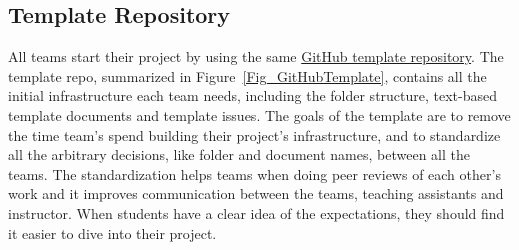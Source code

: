\documentclass[10pt, conference]{IEEEtran}
\begin{document}
\subsection{Template Repository}

All teams start their project by using the same
\href{REDACTED Link} {GitHub template repository}. The template repo, summarized
in Figure~\ref{Fig_GitHubTemplate}, contains all the initial infrastructure each
team needs, including the folder structure, text-based template documents and
template issues. The goals of the template are to remove the time team's spend
building their project's infrastructure, and to standardize all the arbitrary
decisions, like folder and document names, between all the teams. The
standardization helps teams when doing peer reviews of each other's work and it
improves communication between the teams, teaching assistants and instructor.
When students have a clear idea of the expectations, they should find it easier
to dive into their project.
\end{document}
